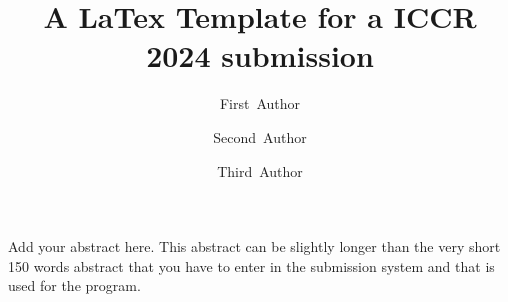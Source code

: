 \documentclass[11pt,twocolumn,twoside]{article}
\begin{document}
\title{A LaTex Template for a ICCR 2024 submission} 

\author[1]{First~Author}
\author[1,2]{Second~Author}
\author[2]{Third~Author}



\maketitle
\thispagestyle{fancy}





\begin{customabstract}
Add your abstract here. This abstract can be slightly longer than the very short 
150 words abstract that you have to enter in the submission system and that is used 
for the program. 
\end{customabstract}






\printbibliography
\end{document}

